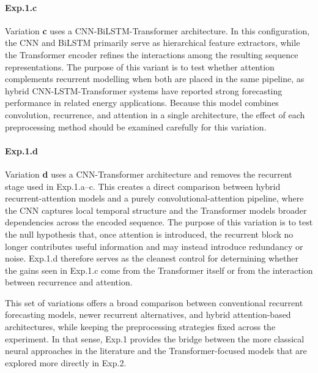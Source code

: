 \paragraph{Exp.1.c}
Variation \textbf{c} uses a CNN-BiLSTM-Transformer architecture. In this configuration, the CNN and BiLSTM primarily serve as hierarchical feature extractors, while the Transformer encoder refines the interactions among the resulting sequence representations. The purpose of this variant is to test whether attention complements recurrent modelling when both are placed in the same pipeline, as hybrid CNN-LSTM-Transformer systems have reported strong forecasting performance in related energy applications\cite{math11030676,Xu2025}. Because this model combines convolution, recurrence, and attention in a single architecture, the effect of each preprocessing method should be examined carefully for this variation.

\paragraph{Exp.1.d}
Variation \textbf{d} uses a CNN-Transformer architecture and removes the recurrent stage used in Exp.1.a--c. This creates a direct comparison between hybrid recurrent-attention models and a purely convolutional-attention pipeline, where the CNN captures local temporal structure and the Transformer models broader dependencies across the encoded sequence. The purpose of this variation is to test the null hypothesis that, once attention is introduced, the recurrent block no longer contributes useful information and may instead introduce redundancy or noise. Exp.1.d therefore serves as the cleanest control for determining whether the gains seen in Exp.1.c come from the Transformer itself or from the interaction between recurrence and attention.

This set of variations offers a broad comparison between conventional recurrent forecasting models, newer recurrent alternatives, and hybrid attention-based architectures, while keeping the preprocessing strategies fixed across the experiment. In that sense, Exp.1 provides the bridge between the more classical neural approaches in the literature and the Transformer-focused models that are explored more directly in Exp.2\cite{math11030676,Xu2025,Manero2018}.


